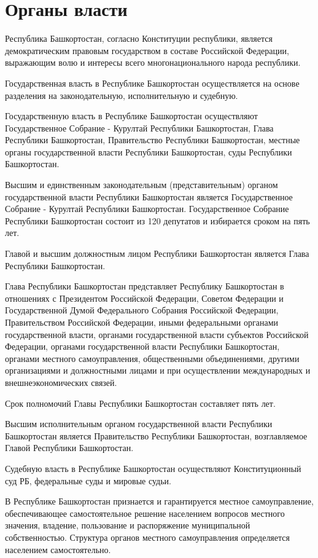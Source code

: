 \section{Органы власти}

Республика Башкортостан, согласно Конституции республики, является демократическим правовым государством в составе Российской Федерации, выражающим волю и интересы всего многонационального народа республики.

Государственная власть в Республике Башкортостан осуществляется на основе разделения на законодательную, исполнительную и судебную.

Государственную власть в Республике Башкортостан осуществляют Государственное Собрание - Курултай Республики Башкортостан, Глава Республики Башкортостан, Правительство Республики Башкортостан, местные органы государственной власти Республики Башкортостан, суды Республики Башкортостан.

Высшим и единственным законодательным (представительным) органом государственной власти Республики Башкортостан является Государственное Собрание - Курултай Республики Башкортостан. Государственное Собрание Республики Башкортостан состоит из 120 депутатов и избирается сроком на пять лет.

Главой и высшим должностным лицом Республики Башкортостан является Глава Республики Башкортостан.

Глава Республики Башкортостан представляет Республику Башкортостан в отношениях с Президентом Российской Федерации, Советом Федерации и Государственной Думой Федерального Собрания Российской Федерации, Правительством Российской Федерации, иными федеральными органами государственной власти, органами государственной власти субъектов Российской Федерации, органами государственной власти Республики Башкортостан, органами местного самоуправления, общественными объединениями, другими организациями и должностными лицами и при осуществлении международных и внешнеэкономических связей.

Срок полномочий Главы Республики Башкортостан составляет пять лет.

Высшим исполнительным органом государственной власти Республики Башкортостан является Правительство Республики Башкортостан, возглавляемое Главой Республики Башкортостан.

Судебную власть в Республике Башкортостан осуществляют Конституционный суд РБ, федеральные суды и мировые судьи.

В Республике Башкортостан признается и гарантируется местное самоуправление, обеспечивающее самостоятельное решение населением вопросов местного значения, владение, пользование и распоряжение муниципальной собственностью. Структура органов местного самоуправления определяется населением самостоятельно.


